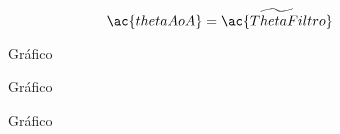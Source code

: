\begin{equation} \label{eq:theta:mediana}
    \ac{thetaAoA} = \widetilde{\ac{ThetaFiltro}}
\end{equation}

\pagebreak


























\begin{figure}[H]
    \centering
    
    \caption{Gráfico}
\end{figure}

\begin{figure}[H]
    \centering
    
    \caption{Gráfico}
\end{figure}

\begin{figure}[H]
    \centering
    
    \caption{Gráfico}
\end{figure}
